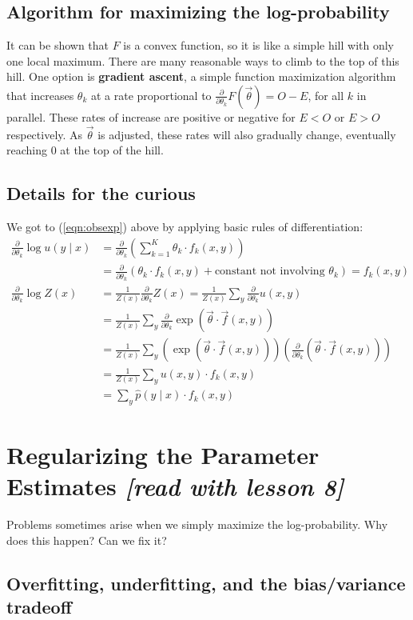 \documentclass[11pt]{article}
\newcommand{\vtheta}{\vec{\theta}}
\newcommand{\ph}{\hat{p}}
\newcommand{\diffk}{\frac{\partial}{\partial \theta_k}}
\begin{document}
\subsection{Algorithm for maximizing the log-probability}

It can be shown that $F$ is a convex function, so it is like a simple
hill with only one local maximum.  There are many reasonable ways to
climb to the top of this hill.  One option is {\bf gradient ascent}, a
simple function maximization algorithm that increases $\theta_k$ at a
rate proportional to $\diffk F(\vtheta)=O-E$, for all $k$ in parallel.
These rates of increase are positive or negative for $E < O$ or $E >
O$ respectively.  As $\vtheta$ is adjusted, these rates will also
gradually change, eventually reaching 0 at the top of the hill.

\subsection{Details for the curious}

We got to (\ref{eqn:obsexp}) above by applying basic rules
of differentiation:
\begin{align}
  \diffk \log u(y \mid x) 
  &= \diffk \left( \sum_{k=1}^K \theta_k \cdot f_k(x,y) \right) \\
  & = \diffk \left( \theta_k \cdot f_k(x,y) + \textrm{constant not involving $\theta_k$} \right) = f_k(x,y)\\
%
  \diffk \log Z(x) &= \frac{1}{Z(x)} \diffk Z(x) 
  = \frac{1}{Z(x)} \sum_y \diffk u(x,y)  \\
  &= \frac{1}{Z(x)} \sum_y \diffk \exp (\vtheta \cdot \vec{f}(x,y))\\
  &= \frac{1}{Z(x)} \sum_y \left( \exp (\vtheta \cdot \vec{f}(x,y)) \right) 
  \left( \diffk (\vtheta \cdot \vec{f}(x,y)) \right) \\
  &= \frac{1}{Z(x)} \sum_y u(x,y) \cdot f_k(x,y) \\
  &= \sum_y \ph(y\mid x) \cdot f_k(x,y)
\end{align}

\section{Regularizing the Parameter Estimates {\em [read with lesson 8]}}

Problems sometimes arise when we simply maximize the log-probability.
Why does this happen?  Can we fix it?

\subsection{Overfitting, underfitting, and the bias/variance tradeoff} 
\end{document}
